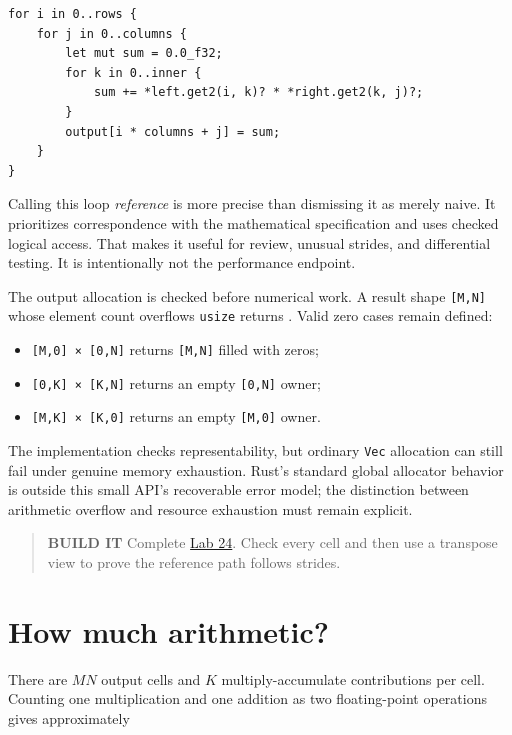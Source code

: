 \begin{verbatim}
for i in 0..rows {
    for j in 0..columns {
        let mut sum = 0.0_f32;
        for k in 0..inner {
            sum += *left.get2(i, k)? * *right.get2(k, j)?;
        }
        output[i * columns + j] = sum;
    }
}
\end{verbatim}

Calling this loop \emph{reference} is more precise than dismissing it as
merely naive. It prioritizes correspondence with the mathematical
specification and uses checked logical access. That makes it useful for
review, unusual strides, and differential testing. It is intentionally
not the performance endpoint.

The output allocation is checked before numerical work. A result shape
\texttt{{[}M,N{]}} whose element count overflows \texttt{usize} returns
\texttt{}. Valid zero cases remain
defined:

\begin{itemize}
\tightlist
\item
  \texttt{{[}M,0{]}\ ×\ {[}0,N{]}} returns \texttt{{[}M,N{]}} filled
  with zeros;
\item
  \texttt{{[}0,K{]}\ ×\ {[}K,N{]}} returns an empty \texttt{{[}0,N{]}}
  owner;
\item
  \texttt{{[}M,K{]}\ ×\ {[}K,0{]}} returns an empty \texttt{{[}M,0{]}}
  owner.
\end{itemize}

The implementation checks representability, but ordinary \texttt{Vec}
allocation can still fail under genuine memory exhaustion. Rust's
standard global allocator behavior is outside this small API's
recoverable error model; the distinction between arithmetic overflow and
resource exhaustion must remain explicit.

\begin{quote}
\textbf{BUILD IT} Complete
\href{https://github.com/hermonai/inside-the-llm-engine/blob/astra-visual-rewrite/labs/lab-24-gemm-by-hand.md}{Lab
24}. Check every cell and then use a transpose view to prove the
reference path follows strides.
\end{quote}

\section{How much arithmetic?}\label{how-much-arithmetic}

There are \(MN\) output cells and \(K\) multiply-accumulate
contributions per cell. Counting one multiplication and one addition as
two floating-point operations gives approximately

